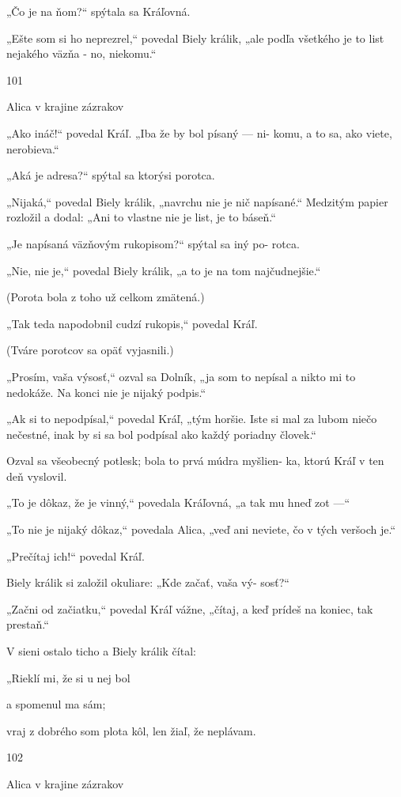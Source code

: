 \documentclass[12pt]{book}
\begin{document}
\begin{Parallel}[p]{}{}
{„Čo je na ňom?“ spýtala sa Kráľovná.

„Ešte som si ho neprezrel,“ povedal Biely králik, „ale
podľa všetkého je to list nejakého väzňa - no, niekomu.“

101

Alica v krajine zázrakov

„Ako ináč!“ povedal Kráľ. „Iba že by bol písaný — ni-
komu, a to sa, ako viete, nerobieva.“

„Aká je adresa?“ spýtal sa ktorýsi porotca.

„Nijaká,“ povedal Biely králik, „navrchu nie je nič
napísané.“ Medzitým papier rozložil a dodal: „Ani to
vlastne nie je list, je to báseň.“

„Je napísaná väzňovým rukopisom?“ spýtal sa iný po-
rotca.

„Nie, nie je,“ povedal Biely králik, „a to je na tom
najčudnejšie.“

(Porota bola z toho už celkom zmätená.)

„Tak teda napodobnil cudzí rukopis,“ povedal Kráľ.

(Tváre porotcov sa opäť vyjasnili.)

„Prosím, vaša výsosť,“ ozval sa Dolník, „ja som to nepísal
a nikto mi to nedokáže. Na konci nie je nijaký podpis.“

„Ak si to nepodpísal,“ povedal Kráľ, „tým horšie. Iste si
mal za lubom niečo nečestné, inak by si sa bol podpísal ako
každý poriadny človek.“

Ozval sa všeobecný potlesk; bola to prvá múdra myšlien-
ka, ktorú Kráľ v ten deň vyslovil.

„To je dôkaz, že je vinný,“ povedala Kráľovná, „a tak
mu hneď zot —“

„To nie je nijaký dôkaz,“ povedala Alica, „veď ani
neviete, čo v tých veršoch je.“

„Prečítaj ich!“ povedal Kráľ.

Biely králik si založil okuliare: „Kde začať, vaša vý-
sosť?“

„Začni od začiatku,“ povedal Kráľ vážne, „čítaj, a keď
prídeš na koniec, tak prestaň.“

V sieni ostalo ticho a Biely králik čítal:

„Rieklí mi, že si u nej bol

a spomenul ma sám;

vraj z dobrého som plota kôl,
len žiaľ, že neplávam.

102

Alica v krajine zázrakov

}
\end{Parallel}
\end{document}
